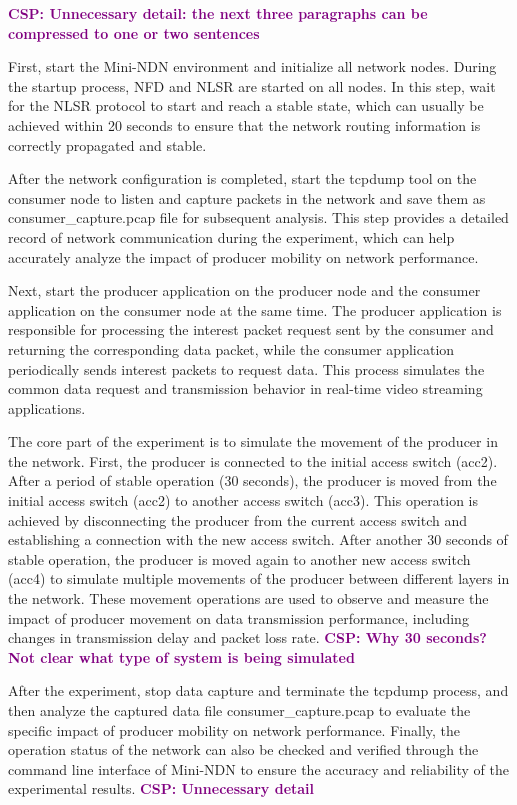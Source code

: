 \documentclass[conference]{IEEEtran}
\newcommand{\csp}[1]{\textbf{\textcolor{purple}{CSP: #1}}}
\begin{document}
\csp{Unnecessary detail: the next three paragraphs can be compressed to one or two sentences}

First, start the Mini-NDN environment and initialize all network nodes. During the startup process, NFD and NLSR are started on all nodes. In this step, wait for the NLSR protocol to start and reach a stable state, which can usually be achieved within 20 seconds to ensure that the network routing information is correctly propagated and stable.

After the network configuration is completed, start the tcpdump tool on the consumer node to listen and capture packets in the network and save them as consumer\_capture.pcap file for subsequent analysis. This step provides a detailed record of network communication during the experiment, which can help accurately analyze the impact of producer mobility on network performance.

Next, start the producer application on the producer node and the consumer application on the consumer node at the same time. The producer application is responsible for processing the interest packet request sent by the consumer and returning the corresponding data packet, while the consumer application periodically sends interest packets to request data. This process simulates the common data request and transmission behavior in real-time video streaming applications.

The core part of the experiment is to simulate the movement of the producer in the network. First, the producer is connected to the initial access switch (acc2). After a period of stable operation (30 seconds), the producer is moved from the initial access switch (acc2) to another access switch (acc3). This operation is achieved by disconnecting the producer from the current access switch and establishing a connection with the new access switch. After another 30 seconds of stable operation, the producer is moved again to another new access switch (acc4) to simulate multiple movements of the producer between different layers in the network. These movement operations are used to observe and measure the impact of producer movement on data transmission performance, including changes in transmission delay and packet loss rate.
\csp{Why 30 seconds? Not clear what type of system is being simulated}

After the experiment, stop data capture and terminate the tcpdump process, and then analyze the captured data file consumer\_capture.pcap to evaluate the specific impact of producer mobility on network performance. Finally, the operation status of the network can also be checked and verified through the command line interface of Mini-NDN to ensure the accuracy and reliability of the experimental results.
\csp{Unnecessary detail}
\end{document}
